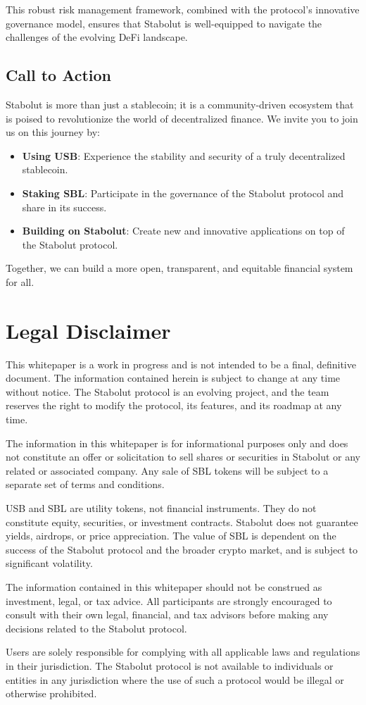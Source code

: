 This robust risk management framework, combined with the protocol's innovative governance model, ensures that Stabolut is well-equipped to navigate the challenges of the evolving DeFi landscape.

\subsection{Call to Action}
Stabolut is more than just a stablecoin; it is a community-driven ecosystem that is poised to revolutionize the world of decentralized finance. We invite you to join us on this journey by:

\begin{itemize}
    \item \textbf{Using USB}: Experience the stability and security of a truly decentralized stablecoin.
    \item \textbf{Staking SBL}: Participate in the governance of the Stabolut protocol and share in its success.
    \item \textbf{Building on Stabolut}: Create new and innovative applications on top of the Stabolut protocol.
\end{itemize}

Together, we can build a more open, transparent, and equitable financial system for all.

\section{Legal Disclaimer}  
This whitepaper is a work in progress and is not intended to be a final, definitive document. The information contained herein is subject to change at any time without notice. The Stabolut protocol is an evolving project, and the team reserves the right to modify the protocol, its features, and its roadmap at any time.

The information in this whitepaper is for informational purposes only and does not constitute an offer or solicitation to sell shares or securities in Stabolut or any related or associated company. Any sale of SBL tokens will be subject to a separate set of terms and conditions.

USB and SBL are utility tokens, not financial instruments. They do not constitute equity, securities, or investment contracts. Stabolut does not guarantee yields, airdrops, or price appreciation. The value of SBL is dependent on the success of the Stabolut protocol and the broader crypto market, and is subject to significant volatility.

The information contained in this whitepaper should not be construed as investment, legal, or tax advice. All participants are strongly encouraged to consult with their own legal, financial, and tax advisors before making any decisions related to the Stabolut protocol.

Users are solely responsible for complying with all applicable laws and regulations in their jurisdiction. The Stabolut protocol is not available to individuals or entities in any jurisdiction where the use of such a protocol would be illegal or otherwise prohibited.  
